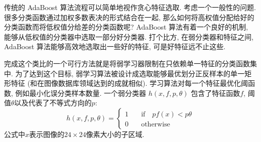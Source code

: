 \documentclass[a4paper,utf8,11pt, onecolumn]{ctexart}
\begin{document}
传统的 AdaBoost 算法流程可以简单地视作贪心特征选取. 考虑一个一般性的问题. 很多分类函数通过加权多数表决的形式结合在一起, 那么如何将高权值分配给好的分类函数而将低权值分给差的分类函数呢? 
AdaBoost 算法有着一个良好的机制, 能够从低权值的分类器中选取一部分好分类器. 打个比方, 在弱分类器和特征之间, AdaBoost 算法能够高效地选取出一些好的特征, 可是好特征远不止这些.

完成这个类比的一个可行方法就是将弱学习器限制在只依赖单一特征的分类函数集中. 为了达到这个目标, 弱学习算法被设计成选取能够最优划分正反样本的单一矩形特征 (和\citet{tieu2000boosting}在图像数据库领域达到的成就相似). 学习算法对每一个特征最优化阈函数, 例如最小化误分类样本数量. 一个弱分类器 $h(x,f,p,\theta)$ 包含了特征函数$f$, 阈值$\theta$以及代表了不等式方向的$p$:
\[
    h(x,f,p,\theta) =
    \begin{cases}
        1 &\quad\text{if}\quad pf(x)<p\theta \\
        0 &\quad\text{otherwise}
    \end{cases}
\]
公式中$x$表示图像的$24\times24$像素大小的子区域.
\end{document}
